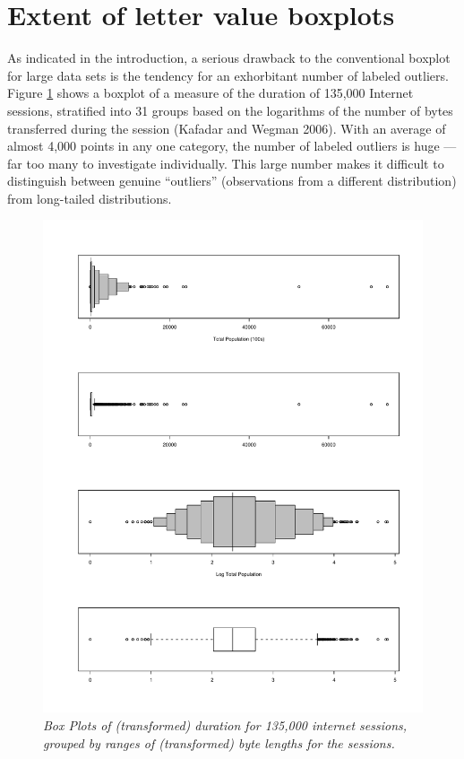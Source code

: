 \documentclass[11pt]{article}
\begin{document}
\section{Extent of letter value boxplots}

As indicated in the introduction, a serious
drawback to the conventional boxplot for large
data sets is the tendency for an exhorbitant
number of labeled outliers.  Figure \ref{kkewbox} 
shows a boxplot of a measure of the duration of
135,000 Internet sessions, stratified
into 31 groups based on the logarithms of
the number of bytes transferred during the
session (Kafadar and Wegman 2006).
With an average of almost 4,000 points in any one category,
the number of labeled outliers is huge --- far too 
many to investigate individually.  This large number
makes it difficult to distinguish between genuine
``outliers'' (observations from a different distribution)
from long-tailed distributions.

\begin{figure}[hbt]
\begin{center}
\includegraphics[width=6in]{lvplot.pdf}
\caption{\it \label{kkewbox} Box Plots of (transformed)
duration for 135,000 internet sessions, grouped by 
ranges of (transformed) byte lengths for the sessions.}
\end{center}
\end{figure}
\end{document}
